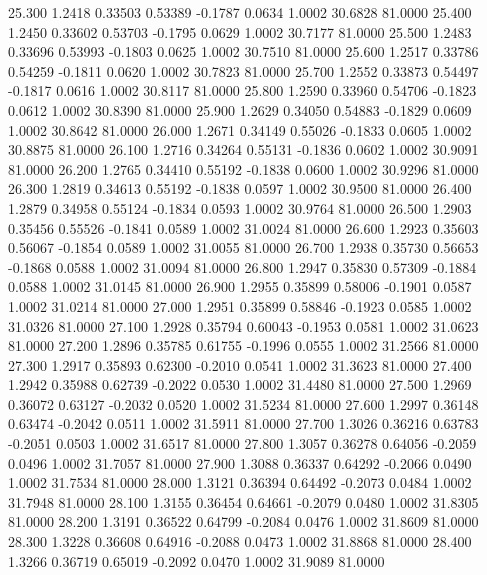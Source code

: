   25.300   1.2418   0.33503   0.53389  -0.1787   0.0634   1.0002  30.6828  81.0000
  25.400   1.2450   0.33602   0.53703  -0.1795   0.0629   1.0002  30.7177  81.0000
  25.500   1.2483   0.33696   0.53993  -0.1803   0.0625   1.0002  30.7510  81.0000
  25.600   1.2517   0.33786   0.54259  -0.1811   0.0620   1.0002  30.7823  81.0000
  25.700   1.2552   0.33873   0.54497  -0.1817   0.0616   1.0002  30.8117  81.0000
  25.800   1.2590   0.33960   0.54706  -0.1823   0.0612   1.0002  30.8390  81.0000
  25.900   1.2629   0.34050   0.54883  -0.1829   0.0609   1.0002  30.8642  81.0000
  26.000   1.2671   0.34149   0.55026  -0.1833   0.0605   1.0002  30.8875  81.0000
  26.100   1.2716   0.34264   0.55131  -0.1836   0.0602   1.0002  30.9091  81.0000
  26.200   1.2765   0.34410   0.55192  -0.1838   0.0600   1.0002  30.9296  81.0000
  26.300   1.2819   0.34613   0.55192  -0.1838   0.0597   1.0002  30.9500  81.0000
  26.400   1.2879   0.34958   0.55124  -0.1834   0.0593   1.0002  30.9764  81.0000
  26.500   1.2903   0.35456   0.55526  -0.1841   0.0589   1.0002  31.0024  81.0000
  26.600   1.2923   0.35603   0.56067  -0.1854   0.0589   1.0002  31.0055  81.0000
  26.700   1.2938   0.35730   0.56653  -0.1868   0.0588   1.0002  31.0094  81.0000
  26.800   1.2947   0.35830   0.57309  -0.1884   0.0588   1.0002  31.0145  81.0000
  26.900   1.2955   0.35899   0.58006  -0.1901   0.0587   1.0002  31.0214  81.0000
  27.000   1.2951   0.35899   0.58846  -0.1923   0.0585   1.0002  31.0326  81.0000
  27.100   1.2928   0.35794   0.60043  -0.1953   0.0581   1.0002  31.0623  81.0000
  27.200   1.2896   0.35785   0.61755  -0.1996   0.0555   1.0002  31.2566  81.0000
  27.300   1.2917   0.35893   0.62300  -0.2010   0.0541   1.0002  31.3623  81.0000
  27.400   1.2942   0.35988   0.62739  -0.2022   0.0530   1.0002  31.4480  81.0000
  27.500   1.2969   0.36072   0.63127  -0.2032   0.0520   1.0002  31.5234  81.0000
  27.600   1.2997   0.36148   0.63474  -0.2042   0.0511   1.0002  31.5911  81.0000
  27.700   1.3026   0.36216   0.63783  -0.2051   0.0503   1.0002  31.6517  81.0000
  27.800   1.3057   0.36278   0.64056  -0.2059   0.0496   1.0002  31.7057  81.0000
  27.900   1.3088   0.36337   0.64292  -0.2066   0.0490   1.0002  31.7534  81.0000
  28.000   1.3121   0.36394   0.64492  -0.2073   0.0484   1.0002  31.7948  81.0000
  28.100   1.3155   0.36454   0.64661  -0.2079   0.0480   1.0002  31.8305  81.0000
  28.200   1.3191   0.36522   0.64799  -0.2084   0.0476   1.0002  31.8609  81.0000
  28.300   1.3228   0.36608   0.64916  -0.2088   0.0473   1.0002  31.8868  81.0000
  28.400   1.3266   0.36719   0.65019  -0.2092   0.0470   1.0002  31.9089  81.0000
